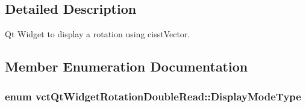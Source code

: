 \subsection{Detailed Description}
Qt Widget to display a rotation using cisst\+Vector. 

\subsection{Member Enumeration Documentation}
\hypertarget{classvct_qt_widget_rotation_double_read_a77ae5a0ee5fe231ad2f9dd020aad434c}{}
\subsubsection[{Display\+Mode\+Type}]{\setlength{\rightskip}{0pt plus 5cm}enum {\bf vct\+Qt\+Widget\+Rotation\+Double\+Read\+::\+Display\+Mode\+Type}}\label{classvct_qt_widget_rotation_double_read_a77ae5a0ee5fe231ad2f9dd020aad434c}
